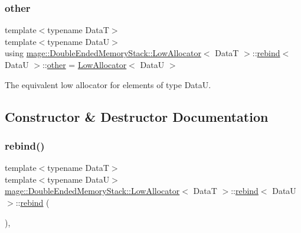 \subsubsection{\texorpdfstring{other}{other}}
{\footnotesize\ttfamily template$<$typename DataT$>$ \\
template$<$typename DataU$>$ \\
using \hyperlink{structmage_1_1_double_ended_memory_stack_1_1_low_allocator}{mage\+::\+Double\+Ended\+Memory\+Stack\+::\+Low\+Allocator}$<$ DataT $>$\+::\hyperlink{structmage_1_1_double_ended_memory_stack_1_1_low_allocator_1_1rebind}{rebind}$<$ DataU $>$\+::\hyperlink{structmage_1_1_double_ended_memory_stack_1_1_low_allocator_1_1rebind_ad2d30609df172b2f8759819439a41bfd}{other} =  \hyperlink{structmage_1_1_double_ended_memory_stack_1_1_low_allocator}{Low\+Allocator}$<$ DataU $>$}

The equivalent low allocator for elements of type {\ttfamily DataU}. 

\subsection{Constructor \& Destructor Documentation}
\hypertarget{structmage_1_1_double_ended_memory_stack_1_1_low_allocator_1_1rebind_a0614241d4b05d08ab4bba55ca793bf5c}{}\label{structmage_1_1_double_ended_memory_stack_1_1_low_allocator_1_1rebind_a0614241d4b05d08ab4bba55ca793bf5c} 
\subsubsection{\texorpdfstring{rebind()}{rebind()}\hspace{0.1cm}{\footnotesize\ttfamily [1/3]}}
{\footnotesize\ttfamily template$<$typename DataT$>$ \\
template$<$typename DataU$>$ \\
\hyperlink{structmage_1_1_double_ended_memory_stack_1_1_low_allocator}{mage\+::\+Double\+Ended\+Memory\+Stack\+::\+Low\+Allocator}$<$ DataT $>$\+::\hyperlink{structmage_1_1_double_ended_memory_stack_1_1_low_allocator_1_1rebind}{rebind}$<$ DataU $>$\+::\hyperlink{structmage_1_1_double_ended_memory_stack_1_1_low_allocator_1_1rebind}{rebind} (\begin{DoxyParamCaption}{ }\end{DoxyParamCaption})\hspace{0.3cm}{\ttfamily [private]}, {\ttfamily [delete]}}

